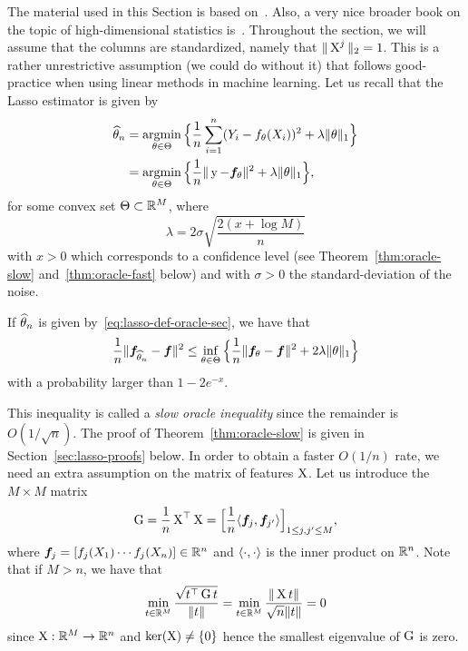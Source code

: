 The material used in this Section is based on~.
Also, a very nice broader book on the topic of high-dimensional statistics is~\cite{giraud2014introduction}.
Throughout the section, we will assume that the columns are standardized, namely that $\| \operatorname{{\boldsymbol X}}^j \|_2 = 1$.
This is a rather unrestrictive assumption (we could do without it) that follows good-practice when using linear methods in machine learning.
Let us recall that the Lasso estimator is given by
\begin{equation}
	\label{eq:lasso-def-oracle-sec}
	\begin{split}
	\widehat \theta_n &= \operatorname*{argmin}_{\theta \in \Theta} \Big\{ \frac 1n \sum_{i=1}^n (Y_i - f_\theta(X_i))^2 + \lambda \| \theta \|_1 \Big\} \\
	&= \operatorname*{argmin}_{\theta \in \Theta} \Big\{ 
	\frac 1n \| \operatorname{{\boldsymbol y}} - {\boldsymbol f}_\theta \|^2 + \lambda \| \theta \|_1 
	\Big\},
	\end{split}
\end{equation}
for some convex set $\Theta \subset \mathbb R^M$, where 
\begin{equation*}
	\lambda = 2 \sigma \sqrt{\frac{2(x + \log M)}{n}}
\end{equation*}
with $x > 0$ which corresponds to a confidence level (see Theorem~\ref{thm:oracle-slow} and~\ref{thm:oracle-fast} below) and with $\sigma > 0$ the standard-deviation of the noise.
\begin{theorem}
	\label{thm:oracle-slow}
	If $\widehat \theta_n$ is given by~\eqref{eq:lasso-def-oracle-sec}, we have that
	\begin{equation*}
		\frac 1n \| {\boldsymbol f}_{\widehat \theta_n} - {\boldsymbol f} \|^2 \leq \inf_{\theta \in \Theta} 
		\Big\{ \frac 1n \| {\boldsymbol f}_{\theta} - {\boldsymbol f} \|^2  + 2 \lambda \| \theta \|_1 \Big\}
	\end{equation*}
	with a probability larger than $1 - 2 e^{-x}$.
\end{theorem}
This inequality is called a \emph{slow oracle inequality} since the remainder is $O(1 / \sqrt{n})$.
The proof of Theorem~\ref{thm:oracle-slow} is given in Section~\ref{sec:lasso-proofs} below.
In order to obtain a faster $O(1 / n)$ rate, we need an extra assumption on the matrix of features $\operatorname{{\boldsymbol X}}$.
Let us introduce the $M \times M$ matrix 
\begin{equation*}
	\operatorname{{\boldsymbol G}} = \frac 1n \operatorname{{\boldsymbol X}}^\top \operatorname{{\boldsymbol X}} = 
	\Big[ \frac 1n \langle {\boldsymbol f}_j, {\boldsymbol f}_{j'} \rangle \Big]_{1 \leq j, j' \leq M},
\end{equation*}
where ${\boldsymbol f}_j = [f_j(X_1) \cdots f_j(X_n)] \in \mathbb R^n$ and $\langle \cdot, \cdot \rangle$ is the inner product on $\mathbb R^n$.
Note that if $M > n$, we have that
\begin{equation*}
	\min_{t \in \mathbb R^M} \frac{\sqrt{t^\top \operatorname{{\boldsymbol G}} t}}{\| t \|} 
	= \min_{t \in \mathbb R^M} \frac{\| \operatorname{{\boldsymbol X}} t \|}{\sqrt n \| t \|} = 0
\end{equation*}
since $\operatorname{{\boldsymbol X}} : \mathbb R^M \rightarrow \mathbb R^n$ and $\ker(\operatorname{{\boldsymbol X}}) \neq \{ 0 \}$ hence the smallest eigenvalue of $\operatorname{{\boldsymbol G}}$ is zero.

